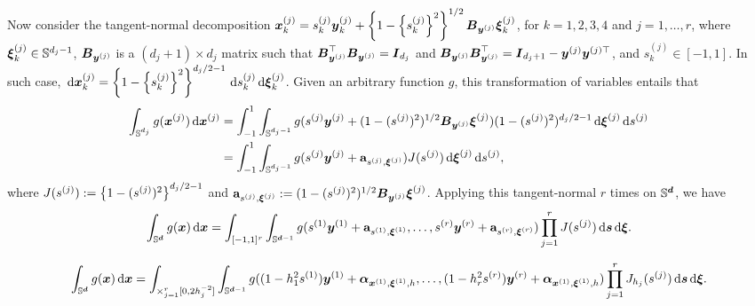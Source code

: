 \documentclass{article}
\begin{document}
Now consider the tangent-normal decomposition $\bx_k^{(j)} = s_k^{(j)} \by_k^{(j)} + \lrb{1 - \lrb{s_k^{(j)}}^2}^{1/2} \bB_{\by^{(j)}} \bxi_k^{(j)}$, for $k = 1,2,3,4$ and $j =1,\dots,r$, where $\bxi_k^{(j)} \in \Sjm$, $\bB_{\by^{(j)}}$  is a $(d_j+1) \times d_j$ matrix such that $\bB_{\by^{(j)}}^{\top} \bB_{\by^{(j)}} = \bI_{d_j}$ and $\bB_{\by^{(j)}} \bB_{\by^{(j)}}^{\top} = \bI_{d_j+1} - \by^{(j)} \by^{(j) \top}$, and $s_k^{(j)} \in [-1,1]$. In such case, $\,\rd \bx_k^{(j)} = \lrb{1 - \lrb{s_k^{(j)}}^2}^{d_j/2 -1} \,\rd s_k^{(j)} \,\rd \bxi_k^{(j)}$. Given an arbitrary function $g$, this transformation of variables entails that
\begin{align*}
    \int_{\Sj} g(\bx^{(j)}) \,\rd \bx^{(j)} &= \int_{-1}^{1} \int_{\Sjm} g(s^{(j)} \by^{(j)} + (1-(s^{(j)})^2)^{1/2} \bB_{\by^{(j)}} \bxi^{(j)}) (1-(s^{(j)})^2)^{d_j/2 -1} \,\rd \bxi^{(j)} \,\rd s^{(j)}\\
    &= \int_{-1}^{1} \int_{\Sjm} g(s^{(j)} \by^{(j)} + \ab_{s^{(j)},\bxi^{(j)}}) J(s^{(j)}) \,\rd \bxi^{(j)} \,\rd s^{(j)},
\end{align*}
where $J(s^{(j)}) \defin \lrb{1 - (s^{(j)})^2}^{d_j/2 -1}$ and $\ab_{s^{(j)},\bxi^{(j)}}\defin (1-(s^{(j)})^2)^{1/2} \bB_{\by^{(j)}} \bxi^{(j)}$. Applying this tangent-normal $r$ times on $\Sr$, we have
\begin{align}
    \int_{\Sr} g(\bx) \,\rd \bx = \int_{[-1,1]^r} \int_{\Srm} g(s^{(1)} \by^{(1)} + \ab_{s^{(1)},\bxi^{(1)}},\ldots, s^{(r)} \by^{(r)} + \ab_{s^{(r)},\bxi^{(r)}}) \prod_{j=1}^r J(s^{(j)}) \,\rd \bs\,\rd \bxi.\label{eq:tnpoly}
\end{align}


\begin{align}
    \int_{\Sr} g(\bx) \,\rd \bx = \int_{\times_{j=1}^r[0,2h_j^{-2}]} \int_{\Srm} g((1-h^2_1s^{(1)}) \by^{(1)} + \ba_{\bx^{(1)},\bxi^{(1)},h},\ldots, (1-h^2_r s^{(r)}) \by^{(r)} + \ba_{\bx^{(1)},\bxi^{(1)},h}) \prod_{j=1}^r J_{h_j}(s^{(j)}) \,\rd \bs\,\rd \bxi.\label{eq:tnpoly}
\end{align}
\end{document}
